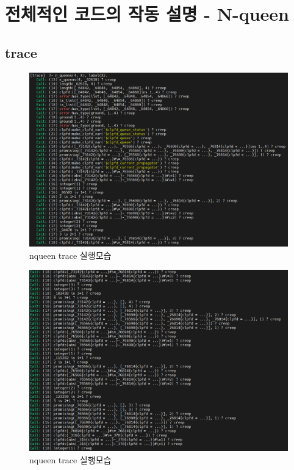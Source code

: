 \documentclass{article}
\begin{document}
\newpage

\section{전체적인 코드의 작동 설명 - N-queen}
\subsection{trace}
\begin{figure}[h]
    \centering
    \includegraphics[scale = 0.7]{tracenqueens1.png}
    \caption{nqueen trace 실행모습}
\end{figure}
\begin{figure}[h]
    \centering
    \includegraphics[scale = 0.7]{tracenqueens2.png}
    \caption{nqueen trace 실행모습}
\end{figure}
\end{document}
